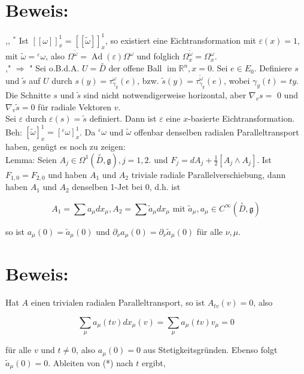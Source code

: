 \documentclass[10pt, letterpaper]{article}
\begin{document}
\section*{Beweis:}
,, ${ }^{*}$ Ist $[[\omega]]_{x}^{1}=[[\tilde{\omega}]]_{x}^{1}$, so existiert eine Eichtransformation mit $\varepsilon(x)=1$, mit $\tilde{\omega}={ }^{\varepsilon} \omega$, also $\Omega^{\tilde{\omega}}=\operatorname{Ad}(\varepsilon) \Omega^{\omega}$ und folglich $\Omega_{x}^{\tilde{\omega}}=\Omega_{x}^{\omega}$.\\
," $\Rightarrow$ " Sei o.B.d.A. $U=\stackrel{\circ}{D}$ der offene Ball $\operatorname{im} \mathbb{R}^{n}, x=0$. Sei $e \in E_{0}$. Definiere $s$ und $\tilde{s}$ auf $U$ durch $s(y)=\tau_{\gamma_{y}}^{\omega}(e)$, bzw. $\tilde{s}(y)=\tau_{\gamma_{y}}^{\tilde{\omega}}(e)$, wobei $\gamma_{y}(t)=t y$. Die Schnitte $s$ und $\tilde{s}$ sind nicht notwendigerweise horizontal, aber $\nabla_{v} s=$ 0 und $\nabla_{v} \tilde{s}=0$ für radiale Vektoren $v$.\\
Sei $\varepsilon$ durch $\varepsilon(s)=\tilde{s}$ definiert. Dann ist $\varepsilon$ eine $x$-basierte Eichtransformation.\\
Beh: $[\tilde{\omega}]_{x}^{1}=\left[{ }^{\varepsilon} \omega\right]_{x}^{1}$. Da ${ }^{\varepsilon} \omega$ und $\tilde{\omega}$ offenbar denselben radialen Paralleltransport haben, genügt es noch zu zeigen:\\
Lemma: Seien $A_{j} \in \Omega^{1}(\stackrel{\circ}{D}, \mathfrak{g}), j=1,2$. und $F_{j}=d A_{j}+\frac{1}{2}\left[A_{j} \wedge A_{j}\right]$. Ist $F_{1,0}=F_{2,0}$ und haben $A_{1}$ und $A_{2}$ triviale radiale Parallelverschiebung, dann haben $A_{1}$ und $A_{2}$ denselben 1-Jet bei 0, d.h. ist

$$
A_{1}=\sum a_{\mu} d x_{\mu}, A_{2}=\sum \tilde{a}_{\mu} d x_{\mu} \text { mit } \tilde{a}_{\mu}, a_{\mu} \in C^{\infty}(\stackrel{\circ}{D}, \mathfrak{g})
$$

so ist $a_{\mu}(0)=\tilde{a}_{\mu}(0)$ und $\partial_{\nu} a_{\mu}(0)=\partial_{\nu} \tilde{a}_{\mu}(0)$ für alle $\nu, \mu$.

\section*{Beweis:}
Hat $A$ einen trivialen radialen Paralleltransport, so ist $A_{t v}(v)=0$, also

$$
\sum_{\mu} a_{\mu}(t v) d x_{\mu}(v)=\sum_{\mu} a_{\mu}(t v) v_{\mu}=0
$$

für alle $v$ und $t \neq 0$, also $a_{\mu}(0)=0$ aus Stetigkeitsgründen. Ebenso folgt $\tilde{a}_{\mu}(0)=0$. Ableiten von (*) nach $t$ ergibt,
\end{document}
